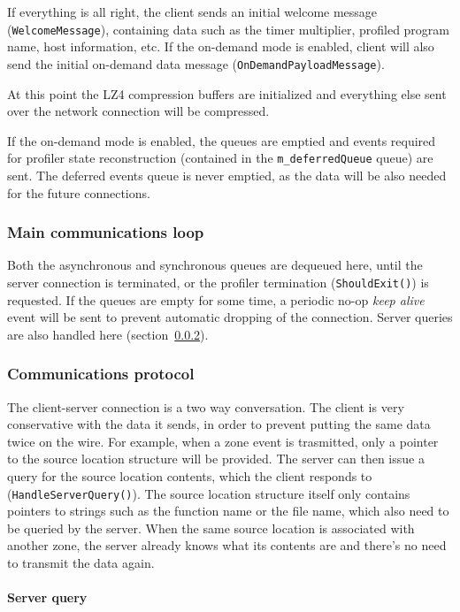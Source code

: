 \documentclass[hidelinks,titlepage,a4paper]{article}
\begin{document}
If everything is all right, the client sends an initial welcome message (\texttt{WelcomeMessage}), containing data such as the timer multiplier, profiled program name, host information, etc. If the on-demand mode is enabled, client will also send the initial on-demand data message (\texttt{OnDemandPayloadMessage}).

At this point the LZ4 compression buffers are initialized and everything else sent over the network connection will be compressed.

If the on-demand mode is enabled, the queues are emptied and events required for profiler state reconstruction (contained in the \texttt{m\_deferredQueue} queue) are sent. The deferred events queue is never emptied, as the data will be also needed for the future connections.

\subsubsection{Main communications loop}

Both the asynchronous and synchronous queues are dequeued here, until the server connection is terminated, or the profiler termination (\texttt{ShouldExit()}) is requested. If the queues are empty for some time, a periodic no-op \emph{keep alive} event will be sent to prevent automatic dropping of the connection. Server queries are also handled here (section~\ref{communicationsprotocol}).

\subsubsection{Communications protocol}
\label{communicationsprotocol}

The client-server connection is a two way conversation. The client is very conservative with the data it sends, in order to prevent putting the same data twice on the wire. For example, when a zone event is trasmitted, only a pointer to the source location structure will be provided. The server can then issue a query for the source location contents, which the client responds to (\texttt{HandleServerQuery()}). The source location structure itself only contains pointers to strings such as the function name or the file name, which also need to be queried by the server. When the same source location is associated with another zone, the server already knows what its contents are and there's no need to transmit the data again.

\paragraph{Server query}
\end{document}
